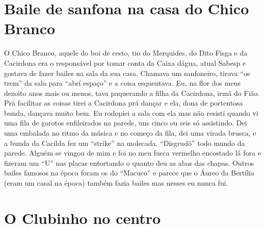 \documentclass[12pt,brazil,]{book}
\begin{document}
\section{Baile de sanfona na casa do Chico
Branco}\label{baile-de-sanfona-na-casa-do-chico-branco}

O Chico Branco, aquele do boi de cesto, tio do Merquides, do Dito Fisga
e da Cacirdona era o responsável por tomar conta da Caixa dágua, atual
Sabesp e gostava de fazer bailes na sala da sua casa. Chamava um
sanfoneiro, tirava ``os trem'' da sala para ``abrí espaço'' e a coisa
esquentava. Eu, na flor dos meus dezoito anos mais ou menos, tava
paquerando a filha da Cacirdona, irmã do Fião. Prá facilitar as coisas
tirei a Cacirdona prá dançar e ela, dona de portentosa bunda, dançava
muito bem. Eu rodopiei a sala com ela mas não resisti quando vi uma fila
de garotos enfileirados na parede, uns cinco ou seis só assistindo. Dei
uma embalada no ritmo da música e no começo da fila, dei uma virada
brusca, e a bunda da Cacilda fez um ``strike'' na molecada. ``Disgrudô''
todo mundo da parede. Alguém se vingou de mim e foi no meu fusca
vermelho encostado lá fora e fizeram um ``U'' nas placas entortando o
quanto deu as abas das chapas. Outros bailes famosos na época foram os
do ``Macuco'' e parece que o Áureo da Bertília (eram um casal na época)
também fazia bailes mas nesses eu nunca fui.

\section{O Clubinho no centro}\label{o-clubinho-no-centro}
\end{document}
